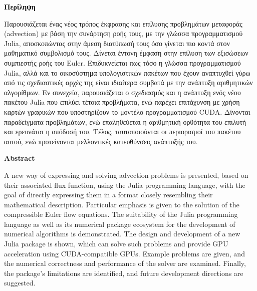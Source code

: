 \newpage
\thispagestyle{plain}
\begin{center}
    \textbf{Περίληψη}
\end{center}

Παρουσιάζεται ένας νέος τρόπος έκφρασης και επίλυσης προβλημάτων μεταφοράς (advection) με βάση την συνάρτηση ροής τους, με την γλώσσα προγραμματισμού Julia, αποσκοπώντας στην άμεση διατύπωσή τους όσο γίνεται πιο κοντά στον μαθηματικό συμβολισμό τους.
Δίνεται έντονη έμφαση στην επίλυση των εξισώσεων συμπιεστής ροής του Euler.
Επιδυκνείεται πως τόσο η γλώσσα προγραμματισμού Julia, αλλά και το οικοσύστημα υπολογιστικών πακέτων που έχουν αναπτυχθεί γύρω από τις σχεδιαστικές αρχές της είναι ιδιαίτερα συμβατά με την ανάπτυξη αριθμητικών αλγορίθμων.
Εν συνεχεία, παρουσιάζεται ο σχεδιασμός και η ανάπτυξη ενός νέου πακέτου Julia που επιλύει τέτοια προβλήματα, ενώ παρέχει επιτάχυνση με χρήση καρτών γραφικών που υποστηρίζουν το μοντέλο προγραμματισμού CUDA.
Δίνονται παραδείγματα προβλημάτων, ενώ επαληθεύεται η αριθμητική ορθότητα του επιλυτή και ερευνάται η απόδοσή του.
Τέλος, ταυτοποιούνται οι περιορισμοί του πακέτου αυτού, ενώ προτείνονται μελλοντικές κατευθύνσεις ανάπτυξής του.

\begin{center}
    \textbf{Abstract}
\end{center}

A new way of expressing and solving advection problems is presented, based on their associated flux function, using the Julia programming language, with the goal of directly expressing them in a format closely resembling their mathematical description.
Particular emphasis is given to the solution of the compressible Euler flow equations.
The suitability of the Julia programming language as well as its numerical package ecosystem for the development of numerical algorithms is demonstrated.
The design and development of a new Julia package is shown, which can solve such problems and provide GPU acceleration using CUDA-compatible GPUs.
Example problems are given, and the numerical correctness and performance of the solver are examined.
Finally, the package's limitations are identified, and future development directions are suggested.

\newpage
